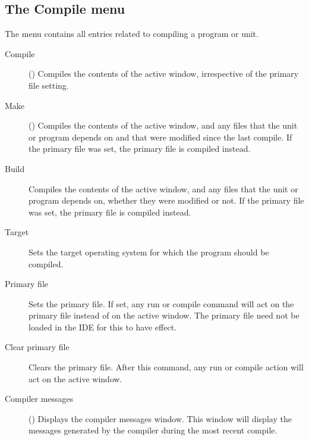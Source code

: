 \subsection{The Compile menu}
\label{se:menucompile}
The  menu contains all entries related to compiling a program or
unit.
\begin{description}
\item[Compile] () Compiles the contents of the active window,
irrespective of the primary file setting.
\item[Make] () Compiles the contents of the active window, and
any files that the unit or program depends on and that were modified since
the last compile.
If the primary file was set, the primary file is compiled instead.
\item[Build]
Compiles the contents of the active window, and any files that the unit or
program depends on, whether they were modified or not.
If the primary file was set, the primary file is compiled instead.
\item[Target] Sets the target operating system for which the program should be compiled.
\item[Primary file] Sets the primary file. If set, any run or compile command
will act on the primary file instead of on the active window. The primary
file need not be loaded in the IDE for this to have effect.
\item[Clear primary file]
Clears the primary file. After this command, any run or compile action will
act on the active window.
\item[Compiler messages] () Displays the compiler messages
window. This window will display the messages generated by the compiler
during the most recent compile.
\end{description}
%
%
